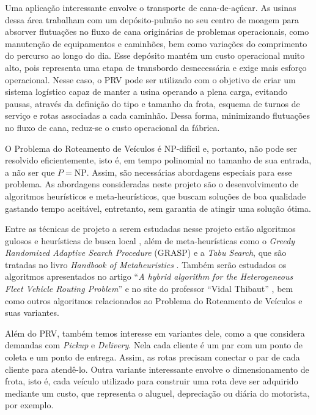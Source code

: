 \documentclass[12pt,a4paper]{article}
\newcommand{\blue}[1]{\textcolor{blue}{#1}}
\newcommand{\np}{\mathrm{NP}}
\begin{document}
Uma aplicação interessante envolve o transporte de cana-de-açúcar. As usinas dessa área trabalham com um depósito-pulmão no seu centro de moagem para absorver flutuações no fluxo de cana originárias de problemas operacionais, como manutenção de equipamentos e caminhões, bem como variações do comprimento do percurso ao longo do dia. Esse depósito mantém um custo operacional muito alto, pois representa uma etapa de transbordo desnecessária e exige mais esforço operacional. Nesse caso, o PRV pode ser utilizado com o objetivo de criar um sistema logístico capaz de manter a usina operando a plena carga, evitando pausas, através da definição do tipo e tamanho da frota, esquema de turnos de serviço e rotas associadas a cada caminhão. Dessa forma, minimizando flutuações no fluxo de cana, reduz-se o custo operacional da fábrica.

O Problema do Roteamento de Veículos é NP-difícil e, portanto, não pode ser resolvido eficientemente, isto é, em tempo polinomial no tamanho de sua entrada, a não ser que ${P =\np}$. Assim, são necessárias abordagens especiais para esse problema. As abordagens consideradas neste projeto são o desenvolvimento de algoritmos heurísticos e meta-heurísticos, que buscam soluções de boa qualidade gastando tempo aceitável, entretanto, sem garantia de atingir uma solução ótima.

Entre as técnicas de projeto a serem estudadas nesse projeto estão algoritmos  gulosos e heurísticas de busca local \cite{dasgupta2008algorithms}, além de meta-heurísticas como o \textit{Greedy Randomized Adaptive Search Procedure} (GRASP) e a \textit{Tabu Search}, que são tratadas no livro \textit{Handbook of Metaheuristics} \cite{glover2006handbook}.
Também serão estudados os algoritmos apresentados no artigo “\textit{A hybrid algorithm for the Heterogeneous Fleet Vehicle Routing Problem}” \cite{subramanian2012hybrid} e no site do professor “Vidal Thibaut” \cite{site}, bem como outros algoritmos relacionados ao Problema do Roteamento de Veículos e suas variantes. 

Além do PRV, também temos interesse em variantes dele, como a que considera demandas com \textit{Pickup} e \textit{Delivery}. Nela cada cliente é um par com um ponto de coleta e um ponto de entrega. Assim, as rotas precisam conectar o par de cada cliente para atendê-lo. Outra variante interessante envolve o dimensionamento de frota, isto é, cada veículo utilizado para construir uma rota deve ser adquirido mediante um custo, que representa o aluguel, depreciação ou diária do motorista, por exemplo.
\end{document}
